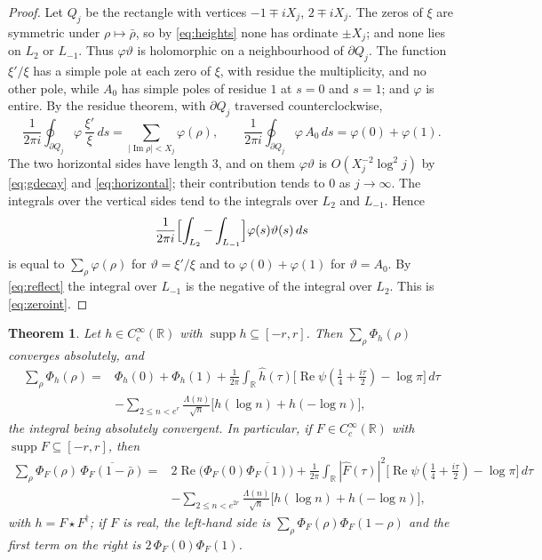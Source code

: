 \documentclass[11pt]{amsart}
\newtheorem{theorem}{Theorem}[section]
\theoremstyle{remark}
\numberwithin{equation}{section}
\newcommand{\R}{\mathbb R}
\newcommand{\Rel}{\operatorname{Re}}
\newcommand{\Iml}{\operatorname{Im}}
\newcommand{\supp}{\operatorname{supp}}
\begin{document}
\begin{proof}
Let $Q_j$ be the rectangle with vertices $-1\mp iX_j$, $2\mp iX_j$.  The
zeros of $\xi$ are symmetric under $\rho\mapsto\bar\rho$, so by
\eqref{eq:heights} none has ordinate $\pm X_j$; and none lies on $L_2$ or
$L_{-1}$.  Thus $\varphi \vartheta$ is holomorphic on a neighbourhood of $\partial Q_j$.
The function $\xi'/\xi$ has a simple pole at each zero of $\xi$, with residue
the multiplicity, and no other pole, while $A_0$ has simple poles of residue
$1$ at $s=0$ and $s=1$; and $\varphi$ is entire.  By the residue theorem, with
$\partial Q_j$ traversed counterclockwise,
\[
  \frac1{2\pi i}\oint_{\partial Q_j}\varphi \,\frac{\xi'}{\xi}\,ds
  =\sum_{|\Iml\rho|<X_j}\varphi(\rho),\qquad
  \frac1{2\pi i}\oint_{\partial Q_j}\varphi \,A_0\,ds=\varphi(0)+\varphi(1).
\]
The two horizontal sides have length $3$, and on them $\varphi \vartheta$ is
$O(X_j^{-2}\log^2j)$ by \eqref{eq:gdecay} and \eqref{eq:horizontal}; their
contribution tends to $0$ as $j\to\infty$.  The integrals over the vertical
sides tend to the integrals over $L_2$ and $L_{-1}$.  Hence
\[
  \frac1{2\pi i}\Bigl[\int_{L_2}-\int_{L_{-1}}\Bigr]\varphi(s)\vartheta(s)\,ds
\]
is equal to $\sum_\rho \varphi(\rho)$ for $\vartheta=\xi'/\xi$ and to $\varphi(0)+\varphi(1)$ for
$\vartheta=A_0$.  By \eqref{eq:reflect} the integral over $L_{-1}$ is the negative of
the integral over $L_2$.  This is \eqref{eq:zeroint}.
\end{proof}

\begin{theorem}
\label{thm:EF}
Let $h\in C_c^\infty(\R)$ with $\supp h\subseteq[-r,r]$.  Then
$\sum_\rho\Phi_h(\rho)$ converges absolutely, and
\begin{equation}
\label{eq:EFh}
\begin{aligned}
  \sum_\rho\Phi_h(\rho)={}&\Phi_h(0)+\Phi_h(1)
   +\frac1{2\pi}\int_\R\hat h(\tau)
     \bigl[\Rel\psi(\tfrac14+\tfrac{i\tau}2)-\log\pi\bigr]\,d\tau\\
   &-\sum_{2\le n<e^{r}}\frac{\Lambda(n)}{\sqrt n}
      \bigl[h(\log n)+h(-\log n)\bigr],
\end{aligned}
\end{equation}
the integral being absolutely convergent.  In particular, if
$F\in C_c^\infty(\R)$ with $\supp F\subseteq[-r,r]$, then
\begin{equation}
\label{eq:EF}
\begin{aligned}
  \sum_\rho\Phi_F(\rho)\,\overline{\Phi_F(1-\bar\rho)}
  ={}&2\Rel\bigl(\Phi_F(0)\overline{\Phi_F(1)}\bigr)
  +\frac1{2\pi}\int_\R|\hat F(\tau)|^2
     \bigl[\Rel\psi(\tfrac14+\tfrac{i\tau}2)-\log\pi\bigr]\,d\tau\\
  &-\sum_{2\le n<e^{2r}}\frac{\Lambda(n)}{\sqrt n}
     \bigl[h(\log n)+h(-\log n)\bigr],
\end{aligned}
\end{equation}
with $h=F\star F^\dagger$; if $F$ is real, the left-hand side is
$\sum_\rho\Phi_F(\rho)\Phi_F(1-\rho)$ and the first term on the right is
$2\,\Phi_F(0)\Phi_F(1)$.
\end{theorem}
\end{document}
